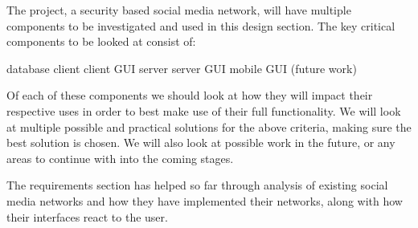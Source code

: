 The project, a security based social media network, will have multiple components to be investigated and used in this design section. The key critical components to be looked at consist of:

database
client
client GUI
server
server GUI
mobile GUI (future work)

Of each of these components we should look at how they will impact their respective uses in order to best make use of their full functionality. We will look at multiple possible and practical solutions for the above criteria, making sure the best solution is chosen. We will also look at possible work in the future, or any areas to continue with into the coming stages.

The requirements section has helped so far through analysis of existing social media networks and how they have implemented their networks, along with how their interfaces react to the user.
